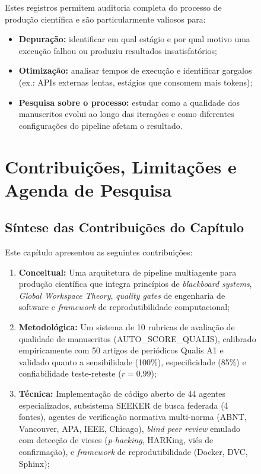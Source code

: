 \begin{figure}
Estes registros permitem auditoria completa do processo de
produção científica e são particularmente valiosos para:

\begin{itemize}
    \item \textbf{Depuração:} identificar em qual estágio e por
    qual motivo uma execução falhou ou produziu resultados
    insatisfatórios;

    \item \textbf{Otimização:} analisar tempos de execução e
    identificar gargalos (ex.: APIs externas lentas, estágios que
    consomem mais tokens);

    \item \textbf{Pesquisa sobre o processo:} estudar como a
    qualidade dos manuscritos evolui ao longo das iterações e
    como diferentes configurações do pipeline afetam o resultado.
\end{itemize}

\section{Contribuições, Limitações e Agenda de Pesquisa}
\label{sec:contribuicoes_final}

\subsection{Síntese das Contribuições do Capítulo}
\label{sec:sintese_contribuicoes}

Este capítulo apresentou as seguintes contribuições:

\begin{enumerate}
    \item \textbf{Conceitual:} Uma arquitetura de pipeline
    multiagente para produção científica que integra princípios
    de \textit{blackboard systems}, \textit{Global Workspace
    Theory}, \textit{quality gates} de engenharia de software e
    \textit{framework} de reprodutibilidade computacional;

    \item \textbf{Metodológica:} Um sistema de 10 rubricas de
    avaliação de qualidade de manuscritos (AUTO\_SCORE\_QUALIS),
    calibrado empiricamente com 50 artigos de periódicos Qualis
    A1 e validado quanto a sensibilidade (100\%), especificidade
    (85\%) e confiabilidade teste-reteste ($r = 0.99$);

    \item \textbf{Técnica:} Implementação de código aberto de 44
    agentes especializados, subsistema SEEKER de busca federada
    (4 fontes), agentes de verificação normativa multi-norma
    (ABNT, Vancouver, APA, IEEE, Chicago), \textit{blind peer
    review} emulado com detecção de vieses (\textit{p-hacking},
    HARKing, viés de confirmação), e \textit{framework} de
    reprodutibilidade (Docker, DVC, Sphinx);


\end{enumerate}
\end{figure}
